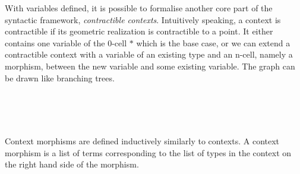 \documentclass{acm_proc_article-sp}
\begin{document}
With variables defined, it is possible to formalise another core part of the syntactic framework, \emph{contractible
contexts}. Intuitively speaking, a context is contractible if its geometric
realization is contractible to a point. It either contains one variable of the 0-cell $*$ which is the base case, or we can extend a contractible context with a
variable of an existing type and an n-cell, namely a morphism, between the new variable and some existing variable. The graph can be drawn like branching trees.

\begin{code}%
\>  \<%
\\
\>[0]\<[2]%
\>[2] \<[7]%
\>[7]\AgdaSymbol{:}  \AgdaSymbol{(} \AgdaInductiveConstructor{,} \AgdaInductiveConstructor{*}\AgdaSymbol{)}\<%
\\
\>[0]\<[2]%
\>[2] \<[7]%
\>[7]\AgdaSymbol{:} \AgdaSymbol{\}}     \AgdaSymbol{\{} \AgdaSymbol{:}  \AgdaSymbol{\}(} \AgdaSymbol{:}  \AgdaSymbol{)} \<[50]%
\>[50]\<%
\\
\>[2]\<[7]%
\>[7]  \AgdaSymbol{(} \AgdaInductiveConstructor{,}  \AgdaInductiveConstructor{,} \AgdaSymbol{(} \AgdaSymbol{(} \AgdaSymbol{)}   \AgdaSymbol{))} \<[54]%
\>[54]\<%
\end{code}
Context morphisms are defined inductively similarly to contexts. A context morphism is a list of terms corresponding to the list of types in the context on the right hand side of the morphism.

\begin{code}%
\>  \<%
\\
\>[0]\<[2]%
\>[2] \<[7]%
\>[7]\AgdaSymbol{:} \AgdaSymbol{\}}    \<%
\\
\>[0]\<[2]%
\>[2]\AgdaInductiveConstructor{\_,\_} \<[7]%
\>[7]\AgdaSymbol{:}  \AgdaSymbol{\}(} \AgdaSymbol{:}   \AgdaSymbol{)\{} \AgdaSymbol{:}  \AgdaSymbol{\}(} \AgdaSymbol{:}  \AgdaSymbol{(} \AgdaFunction{[}  \AgdaFunction{]T}\AgdaSymbol{))}\<%
\\
\>[2]\<[7]%
\>[7]   \AgdaSymbol{(} \AgdaInductiveConstructor{,} \AgdaSymbol{)}\<%
\end{code}
\end{document}
